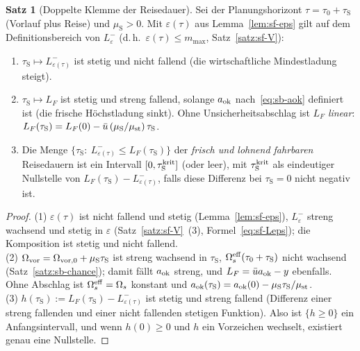 \documentclass[a4paper, 12pt, twoside, openright]{report}
\theoremstyle{definition}
\theoremstyle{definition}
\newtheorem{satz}{Satz}[chapter]
\begin{document}
\begin{satz}[Doppelte Klemme der Reisedauer]\label{satz:sb-klemme}
Sei der Planungshorizont $\tau=\tau_0+\tau_{\mathrm S}$ (Vorlauf plus Reise) und
$\mu_{\mathrm S}>0$. Mit $\varepsilon(\tau)$ aus Lemma~\ref{lem:sf-eps} gilt auf dem
Definitionsbereich von $L_\varepsilon^-$ (d.\,h.\ $\varepsilon(\tau)\le m_{\max}$, Satz~\ref{satz:sf-V}):
\begin{enumerate}
  \item $\tau_{\mathrm S}\mapsto L_{\varepsilon(\tau)}^-$ ist stetig und nicht fallend (die
    wirtschaftliche Mindestladung steigt).
  \item $\tau_{\mathrm S}\mapsto L_F$ ist stetig und streng fallend, solange $a_{\rm ok}$
    nach~\eqref{eq:sb-aok} definiert ist (die frische Höchstladung sinkt). Ohne Unsicherheitsabschlag
    ist $L_F$ \emph{linear}: $L_F(\tau_{\mathrm S})=L_F(0)-\bar u\,(\mu_{\mathrm S}/\mu_{\rm st})\,\tau_{\mathrm S}$.
  \item Die Menge $\{\tau_{\mathrm S}:\ L_{\varepsilon(\tau)}^-\le L_F(\tau_{\mathrm S})\}$ der
    \emph{frisch und lohnend fahrbaren} Reisedauern ist ein Intervall $[0,\tau_{\mathrm S}^{\rm krit}]$
    (oder leer), mit $\tau_{\mathrm S}^{\rm krit}$ als eindeutiger Nullstelle von
    $L_F(\tau_{\mathrm S})-L_{\varepsilon(\tau)}^-$, falls diese Differenz bei $\tau_{\mathrm S}=0$
    nicht negativ ist.
\end{enumerate}
\end{satz}

\begin{proof}
(1) $\varepsilon(\tau)$ ist nicht fallend und stetig (Lemma~\ref{lem:sf-eps}), $L_\varepsilon^-$ streng
wachsend und stetig in $\varepsilon$ (Satz~\ref{satz:sf-V}~(3), Formel~\eqref{eq:sf-Leps});
die Komposition ist stetig und nicht fallend.\\
(2) $\Omega_{\rm vor}=\Omega_{\rm vor,0}+\mu_{\mathrm S}\tau_{\mathrm S}$ ist streng wachsend in
$\tau_{\mathrm S}$, $\Omega_s^{\rm eff}(\tau_0+\tau_{\mathrm S})$ nicht wachsend (Satz~\ref{satz:sb-chance}); damit fällt
$a_{\rm ok}$ streng, und $L_F=\bar ua_{\rm ok}-y$ ebenfalls. Ohne Abschlag ist
$\Omega_s^{\rm eff}=\Omega_s$ konstant und $a_{\rm ok}(\tau_{\mathrm S})=a_{\rm ok}(0)-\mu_{\mathrm S}\tau_{\mathrm S}/\mu_{\rm st}$.\\
(3) $h(\tau_{\mathrm S}):=L_F(\tau_{\mathrm S})-L_{\varepsilon(\tau)}^-$ ist stetig und streng fallend (Differenz
einer streng fallenden und einer nicht fallenden stetigen Funktion). Also ist $\{h\ge0\}$ ein
Anfangsintervall, und wenn $h(0)\ge0$ und $h$ ein Vorzeichen wechselt, existiert genau eine Nullstelle.
\end{proof}
\end{document}
